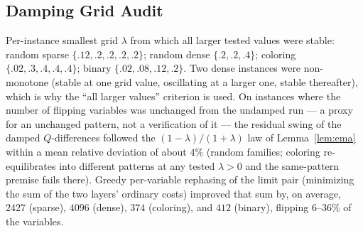 \documentclass[letterpaper]{article} %
\theoremstyle{definition}
\theoremstyle{remark}
\begin{document}
\subsection{Damping Grid Audit}

Per-instance smallest grid $\lambda$ from which all larger tested values
were stable: random sparse $\{.12, .2, .2, .2, .2\}$; random dense
$\{.2, .2, .4\}$; coloring $\{.02, .3, .4, .4, .4\}$; binary
$\{.02, .08, .12, .2\}$.  Two dense instances were non-monotone (stable
at one grid value, oscillating at a larger one, stable thereafter),
which is why the ``all larger values'' criterion is used.  On instances
where the number of flipping variables was unchanged from the undamped
run --- a proxy for an unchanged pattern, not a verification of it ---
the residual swing of the damped $Q$-differences followed the
$(1-\lambda)/(1+\lambda)$ law of Lemma~\ref{lem:ema} within a mean
relative deviation of about $4\%$ (random families; coloring
re-equilibrates into different patterns at any tested $\lambda > 0$ and
the same-pattern premise fails there).  Greedy per-variable rephasing of
the limit pair (minimizing the sum of the two layers' ordinary costs)
improved that sum by, on average, $2427$ (sparse), $4096$ (dense),
$374$ (coloring), and $412$ (binary), flipping $6$--$36\%$ of the
variables.



\def\isChecklistMainFile{}
\end{document}
